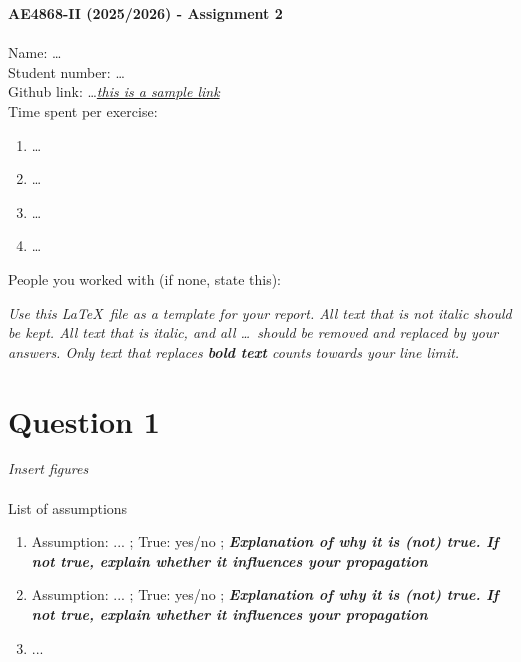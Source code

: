 \documentclass{report}
\begin{document}
\Large
\textbf{AE4868-II (2025/2026) - Assignment 2} \\
\normalsize \\

Name: \ldots \\

Student number: \ldots \\

Github link: \ldots \textit{\href{https://github.com/my_github_username/my_private_repo}{this is a sample link}} \\

Time spent per exercise:
\begin{enumerate}
    \item \ldots
    \item \ldots
    \item \ldots
    \item \ldots

\end{enumerate} 

People you worked with (if none, state this):

\clearpage

\noindent\textit{Use this \LaTeX~file as a template for your report. All text that is not italic should be kept. All text that is italic, and all \ldots~should be removed and replaced by your answers. Only text that replaces \textbf{bold text} counts towards your line limit.}

\section*{Question 1}

\textit{Insert figures} \\ 
\\
{{List of assumptions }}\\
\begin{enumerate}
    \item Assumption: ... ; True: yes/no  ;   \textbf{\textit{Explanation of why it is (not) true. If not true, explain whether it influences your propagation }}
    \item Assumption: ... ; True: yes/no ;   \textbf{\textit{Explanation of why it is (not) true. If not true, explain whether it influences your propagation }}
    \item ...
\end{enumerate}

\clearpage
\end{document}
